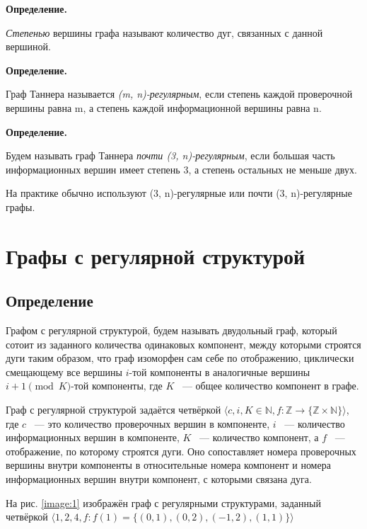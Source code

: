 \documentclass[14pt]{mmcs_article}
\begin{document}
\textbf{Определение.}

\textsl{Степенью} вершины графа называют количество дуг, связанных с данной вершиной.

\textbf{Определение.}

Граф Таннера называется \textsl{(m, n)-регулярным}, если степень каждой проверочной вершины равна m, а степень каждой информационной вершины равна n.

\textbf{Определение.}

Будем называть граф Таннера \textsl{почти (3, n)-регулярным}, если большая часть информационных вершин имеет степень 3, а степень остальных не меньше двух.

На практике обычно используют (3, n)-регулярные или почти (3, n)-регулярные графы.

\newpage
\section{Графы с регулярной структурой}

\subsection{Определение}

Графом с регулярной структурой, будем называть двудольный граф, который сотоит из заданного количества одинаковых компонент, между которыми строятся дуги таким образом, что граф изоморфен сам себе по отображению, циклически смещающему все вершины $i$-той компоненты в аналогичные вершины $i + 1 \pmod K$-той компоненты, где $K$ ~--- общее количество компонент в графе.

Граф с регулярной структурой задаётся четвёркой $\langle c, i, K \in \mathbb{N}, f: \mathbb{Z} \rightarrow \{ \mathbb{Z} \times \mathbb{N} \} \rangle$, где $c$ ~--- это количество проверочных вершин в компоненте, $i$ ~--- количество информационных вершин в компоненте, $K$ ~--- количество компонент, а $f$ ~--- отображение, по которому строятся дуги. Оно сопоставляет номера проверочных вершины внутри компоненты в относительные номера компонент и номера информационных вершин внутри компонент, с которыми связана дуга.

На рис. \ref{image:1} изображён граф с регулярными структурами, заданный четвёркой $\langle 1, 2, 4, f: f(1) = \{ (0, 1), (0, 2), (-1, 2), (1, 1) \} \rangle$
\end{document}
